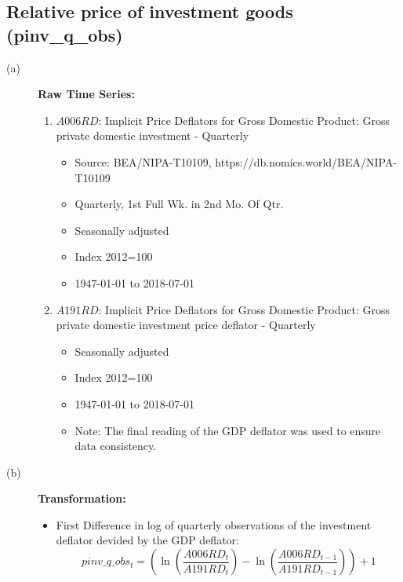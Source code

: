 \documentclass[3p,review,times]{elsarticle}		%
\begin{document}
\subsection{Relative price of investment goods (pinv\_q\_obs)}
\begin{description}
	\item[(a)] \textbf{Raw Time Series:}
	\begin{enumerate}
		\item $A006RD$: Implicit Price Deflators for Gross Domestic Product: Gross private domestic investment - Quarterly
		
		\begin{itemize}
			\item Source: BEA/NIPA-T10109, https://db.nomics.world/BEA/NIPA-T10109
			\item Quarterly, 1st Full Wk. in 2nd Mo. Of Qtr.
			\item Seasonally adjusted
			\item Index 2012=100
			\item 1947-01-01 to 2018-07-01

		
		\end{itemize}
		\item $A191RD$: Implicit Price Deflators for Gross Domestic Product: Gross private domestic investment price deflator - Quarterly
				\begin{itemize}
					\item Seasonally adjusted
					\item Index 2012=100
					\item 1947-01-01 to 2018-07-01
					\item Note: The final reading of the GDP deflator was used to ensure data consistency.
				\end{itemize}

	\end{enumerate}
	\item[(b)] \textbf{Transformation:}
	\begin{itemize}			
		\item First Difference in log of quarterly observations of the investment deflator devided by the GDP deflator:
		$$pinv\_q\_obs_{t}=\left(\ln\left(\frac{A006RD_t}{A191RD_t}\right)-\ln\left(\frac{A006RD_{t-1}}{A191RD_{t-1}}\right)\right) + 1 $$ 
	\end{itemize}
\end{description}
\end{document}
